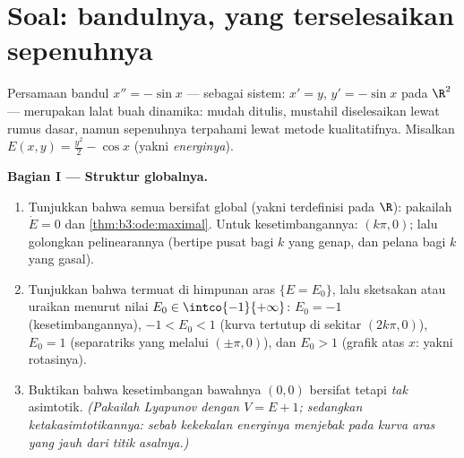 \section{Soal: bandulnya, yang terselesaikan sepenuhnya}

\begin{problem}\label{pb:b3:ode:1}
Persamaan bandul $x'' = -\sin x$ --- sebagai sistem: $x' =
y$, $y' = -\sin x$ pada $\R^2$ --- merupakan lalat buah
dinamika: mudah ditulis, mustahil diselesaikan lewat rumus
dasar, namun sepenuhnya terpahami lewat metode kualitatifnya.
Misalkan $E(x, y) = \frac{y^2}2 - \cos x$ (yakni
\emph{energinya}).

\medskip
\noindent\textbf{Bagian I --- Struktur globalnya.}
\begin{enumerate}
  \item Tunjukkan bahwa semua  bersifat global
        (yakni terdefinisi pada $\R$): pakailah $\dot E = 0$ dan
        \cref{thm:b3:ode:maximal}. Untuk kesetimbangannya: $(k\pi, 0)$;
        lalu golongkan pelinearannya (bertipe pusat bagi $k$ yang genap,
        dan pelana bagi $k$ yang gasal).
  \item Tunjukkan bahwa  termuat di himpunan aras
        $\{E = E_0\}$, lalu sketsakan atau uraikan menurut
        nilai $E_0 \in \intco{-1}{+\infty}$: $E_0 = -1$
        (kesetimbangannya), $-1 < E_0 < 1$ (kurva tertutup di sekitar
        $(2k\pi, 0)$), $E_0 = 1$ (separatriks yang melalui
        $(\pm\pi, 0)$), dan $E_0 > 1$ (grafik atas $x$:
        yakni rotasinya).
  \item Buktikan bahwa kesetimbangan bawahnya $(0,0)$ bersifat 
        tetapi \emph{tak}  asimtotik. \emph{(Pakailah Lyapunov
        dengan $V = E + 1$; sedangkan ketakasimtotikannya: sebab kekekalan energinya
        menjebak  pada kurva aras yang jauh dari
        titik asalnya.)}
\end{enumerate}


\end{problem}
